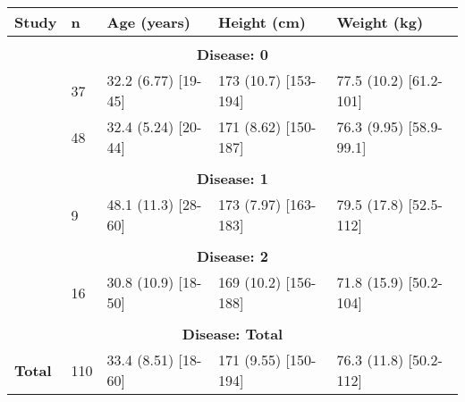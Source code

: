 \documentclass[varwidth, border={10 5 50 5}]{standalone}
\begin{document}
\begin{tabular}{lllll}
  \hline
 {\bfseries Study } & {\bfseries n } & {\bfseries Age (years) } & {\bfseries Height (cm) } & {\bfseries Weight (kg) } \\ \hline
\multicolumn{5}{c}{}\\ \multicolumn{5}{c}{{\bfseries Disease: 0}}\\ \hline
 \quad 390         & 37  & 32.2 (6.77) [19-45] & 173 (10.7) [153-194] & 77.5 (10.2) [61.2-101]  \\
 \quad 620         & 48  & 32.4 (5.24) [20-44] & 171 (8.62) [150-187] & 76.3 (9.95) [58.9-99.1] \\ \hline
\multicolumn{5}{c}{}\\ \multicolumn{5}{c}{{\bfseries Disease: 1}}\\ \hline
 \quad 620         & 9   & 48.1 (11.3) [28-60] & 173 (7.97) [163-183] & 79.5 (17.8) [52.5-112]  \\ \hline
\multicolumn{5}{c}{}\\ \multicolumn{5}{c}{{\bfseries Disease: 2}}\\ \hline
 \quad 183         & 16  & 30.8 (10.9) [18-50] & 169 (10.2) [156-188] & 71.8 (15.9) [50.2-104]  \\ \hline
\multicolumn{5}{c}{}\\ \multicolumn{5}{c}{{\bfseries Disease: Total}}\\ \hline
 {\bfseries Total} & 110 & 33.4 (8.51) [18-60] & 171 (9.55) [150-194] & 76.3 (11.8) [50.2-112]  \\ \hline
\end{tabular}
\end{document}
